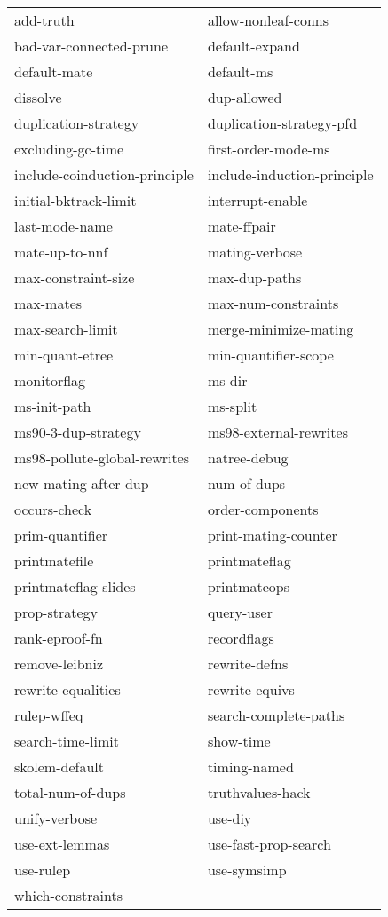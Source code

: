 \begin{description}
\begin{tabular}{l l}
add-truth&allow-nonleaf-conns\\
bad-var-connected-prune&default-expand\\
default-mate&default-ms\\
dissolve&dup-allowed\\
duplication-strategy&duplication-strategy-pfd\\
excluding-gc-time&first-order-mode-ms\\
include-coinduction-principle&include-induction-principle\\
initial-bktrack-limit&interrupt-enable\\
last-mode-name&mate-ffpair\\
mate-up-to-nnf&mating-verbose\\
max-constraint-size&max-dup-paths\\
max-mates&max-num-constraints\\
max-search-limit&merge-minimize-mating\\
min-quant-etree&min-quantifier-scope\\
monitorflag&ms-dir\\
ms-init-path&ms-split\\
ms90-3-dup-strategy&ms98-external-rewrites\\
ms98-pollute-global-rewrites&natree-debug\\
new-mating-after-dup&num-of-dups\\
occurs-check&order-components\\
prim-quantifier&print-mating-counter\\
printmatefile&printmateflag\\
printmateflag-slides&printmateops\\
prop-strategy&query-user\\
rank-eproof-fn&recordflags\\
remove-leibniz&rewrite-defns\\
rewrite-equalities&rewrite-equivs\\
rulep-wffeq&search-complete-paths\\
search-time-limit&show-time\\
skolem-default&timing-named\\
total-num-of-dups&truthvalues-hack\\
unify-verbose&use-diy\\
use-ext-lemmas&use-fast-prop-search\\
use-rulep&use-symsimp\\
which-constraints
\end{tabular}


\end{description}
